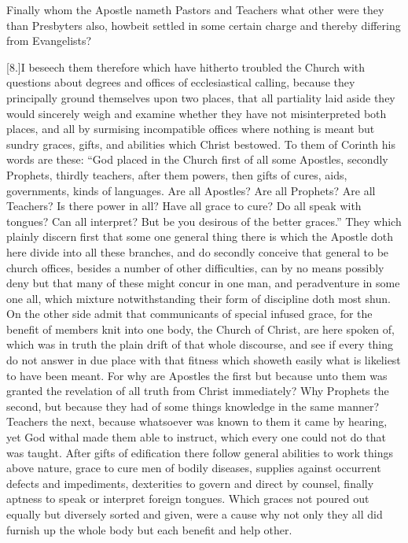 Finally whom the Apostle nameth Pastors and Teachers what other were they than Presbyters also, howbeit settled in some certain charge and thereby differing from Evangelists?

[8.]I beseech them therefore which have hitherto troubled the Church with questions about degrees and offices of ecclesiastical calling, because they principally ground themselves upon two places, that all partiality laid aside they would sincerely weigh and examine whether they have not misinterpreted both places, and all by surmising incompatible offices where nothing is meant but sundry graces, gifts, and abilities which Christ bestowed. To them of Corinth his words are these: “God placed in the Church first of all some Apostles, secondly Prophets, thirdly teachers, after them powers, then gifts of cures, aids, governments, kinds  of languages.
 Are all Apostles? Are all Prophets? Are all Teachers? Is there power in all? Have all grace to cure? Do all speak with tongues? Can all interpret? But be you desirous of the better graces.” They which plainly discern first that some one general thing there is which the Apostle doth here divide into all these branches, and do secondly conceive that general to be church offices, besides a number of other difficulties, can by no means possibly deny but that many of these might concur in one man, and peradventure in some one all, which mixture notwithstanding their form of discipline doth most shun. On the other side admit that communicants of special infused grace, for the benefit of members knit into one body, the Church of Christ, are here spoken of, which was in truth the plain drift of that whole discourse, and see if every thing do not answer in due place with that fitness which showeth easily what is likeliest to have been meant. For why are Apostles the first but because unto them was granted the revelation of all truth from Christ immediately? Why Prophets the second, but because they had of some things knowledge in the same manner? Teachers the next, because whatsoever was known to them it came by hearing, yet God withal made them able to instruct, which every one could not do that was taught. After gifts of edification there follow general abilities to work things above nature, grace to cure men of bodily diseases, supplies against occurrent defects and impediments, dexterities to govern and direct by counsel, finally aptness to speak or interpret foreign tongues. Which graces not poured out equally but diversely sorted and given, were a cause why not only they all did furnish up the whole body but each benefit and help other.

